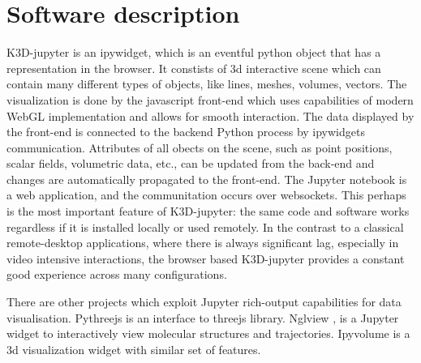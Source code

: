 \documentclass[preprint,12pt, a4paper]{elsarticle}
\begin{document}


\section{Software description}
\label{}



K3D-jupyter is an ipywidget, which is an eventful python object that
has a representation in the browser. It constists of 3d interactive
scene which can contain many different types of objects, like lines,
meshes, volumes, vectors. The visualization is done by the javascript
front-end which uses capabilities of modern WebGL implementation and
allows for smooth interaction. The data displayed by the front-end is
connected to the backend Python process by ipywidgets communication.
Attributes of all obects on the scene, such as point positions, scalar
fields, volumetric data, etc., can be updated from the back-end and 
changes are automatically propagated to the front-end. The Jupyter
notebook is a web application, and the communitation occurs over
websockets. This perhaps is the most important feature of K3D-jupyter:
the same code and software works regardless if it is installed locally
or used remotely. In the contrast to a classical remote-desktop
applications, where there is always significant lag, especially in
video intensive interactions, the browser based K3D-jupyter provides
a constant good experience across many configurations.

There are other projects which exploit Jupyter rich-output
capabilities for data visualisation. Pythreejs\cite{pythreejs} is an
interface to threejs library. Nglview
\cite{10.1093/bioinformatics/btx789}, is a Jupyter widget to
interactively view molecular structures and
trajectories. Ipyvolume\cite{ipyvolume} is a 3d visualization widget
with similar set of features.
\end{document}
